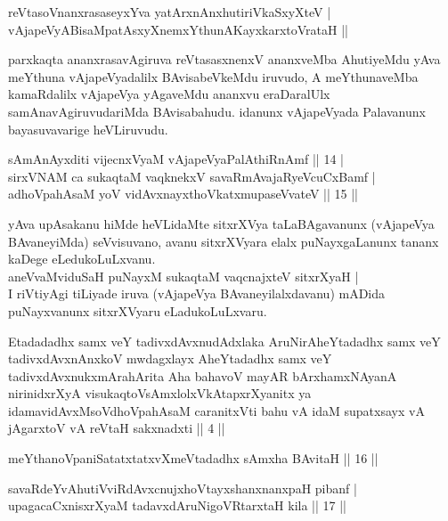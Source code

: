 \begin{shl}
reVtasoV\s nanxrasaseyxYva yatArxnAnxhutiriVkaSxyXteV | \\
vAjapeVyABisaMpatAsxyXnemxYthunAKayxkarxtoVrataH || 
\end{shl}

\begin{artha}
parxkaqta ananxrasavAgiruva reVtasasxnenxV ananxveMba AhutiyeMdu yAva meYthuna vAjapeVyadalilx BAvisabeVkeMdu iruvudo, A meYthunaveMba kamaRdalilx vAjapeVya yAgaveMdu ananxvu eraDaralUlx samAnavAgiruvudariMda BAvisabahudu. idanunx vAjapeVyada Palavanunx bayasuvavarige heVLiruvudu.
\end{artha}


\begin{shl}
sAmAnAyxditi vijecnxVyaM vAjapeVyaPalAthiRnAmf \hfill|| 14 | \\
sirxVNAM ca sukaqtaM vaqknekxV savaRmAvajaRyeVcuCxBamf | \\
adhoVpahAsaM yoV vidAvxnayxthoVkatxmupaseVvateV \hfill|| 15 || 
\end{shl}

\begin{artha}
yAva upAsakanu hiMde heVLidaMte sitxrXVya taLaBAgavanunx (vAjapeVya 
BAvaneyiMda) seVvisuvano, avanu sitxrXVyara elalx puNayxgaLanunx 
tananx kaDege eLedukoLuLxvanu. \\ aneVvaMviduSaH puNayxM sukaqtaM vaqcnajxteV sitxrXyaH | \\ I riVtiyAgi tiLiyade iruva 
(vAjapeVya BAvaneyilalxdavanu) mADida puNayxvanunx sitxrXVyaru eLadukoLuLxvaru.
\end{artha}

\begin{kandikeshl}
Etadadadhx samx veY tadivxdAvxnudAdxlaka AruNirAheYtadadhx samx veY tadivxdAvxnAnxkoV mwdagxlayx AheYtadadhx samx veY tadivxdAvxnukxmArahArita Aha bahavoV mayAR bArxhamxNAyanA nirinidxrXyA visukaqtoV\s sAmxlolxVkAtapxrXyanitx ya idamavidAvxMsoV\s dhoVpahAsaM caranitxVti bahu vA idaM supatxsayx vA jAgarxtoV vA reVtaH sakxnadxti || 4 ||
\end{kandikeshl}

\begin{shl}
meYthanoVpaniSatatxtatxvXmeVtadadhx sAmx\s \s ha BAvitaH \hfill|| 16 || 
\end{shl}

\begin{shl}
savaRdeYvA\s \s hutiVviRdAvxcnujxhoVtayxshanxnanxpaH pibanf | \\
upagacaCxnisxrXyaM tadavxdAruNigoVRtarxtaH kila \hfill|| 17 || 
\end{shl}

